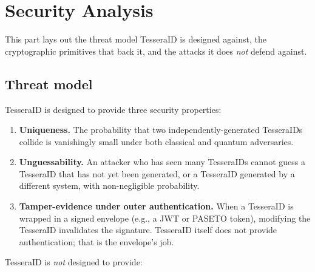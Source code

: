 \section{Security Analysis}
\label{sec:security}

This part lays out the threat model TesseraID is designed against, the cryptographic primitives that back it, and the attacks it does \emph{not} defend against.

\subsection{Threat model}

TesseraID is designed to provide three security properties:

\begin{enumerate}
  \item \textbf{Uniqueness.} The probability that two independently-generated TesseraIDs collide is vanishingly small under both classical and quantum adversaries.
  \item \textbf{Unguessability.} An attacker who has seen many TesseraIDs cannot guess a TesseraID that has not yet been generated, or a TesseraID generated by a different system, with non-negligible probability.
  \item \textbf{Tamper-evidence under outer authentication.} When a TesseraID is wrapped in a signed envelope (e.g., a JWT \citep{rfc7519} or PASETO \citep{paseto} token), modifying the TesseraID invalidates the signature. TesseraID itself does not provide authentication; that is the envelope's job.
\end{enumerate}

TesseraID is \emph{not} designed to provide:


